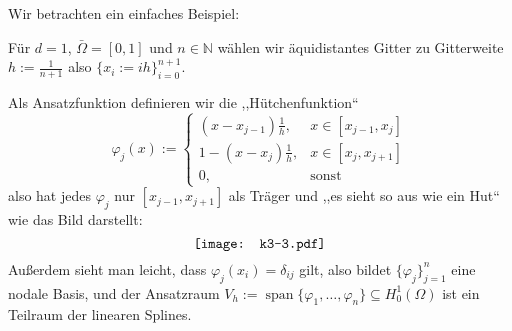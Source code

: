 \documentclass{book}
\newcommand{\assign}{:=}
\newcommand{\tmop}[1]{\ensuremath{\operatorname{#1}}}
\begin{document}
Wir betrachten ein einfaches Beispiel:

F{\"u}r $d = 1$, $\bar{\Omega} = [0, 1]$ und $n \in \mathbb{N}$ w{\"a}hlen
wir {\"a}quidistantes Gitter zu Gitterweite $h \assign \frac{1}{n + 1}$ also
$\{ x_i \assign i h \}_{i = 0}^{n + 1}$.

Als Ansatzfunktion definieren wir die ,,H{\"u}tchenfunktion``
\[ \varphi_j (x) \assign \left\{\begin{array}{cl}
     (x - x_{j - 1}) \frac{1}{h}, & x \in [x_{j - 1}, x_j]\\
     1 - (x - x_j) \frac{1}{h}, & x \in [x_j, x_{j + 1}]\\
     0, & \text{sonst}
   \end{array}\right. \]
also hat jedes $\varphi_j$ nur $[x_{j - 1}, x_{j + 1}]$ als Tr{\"a}ger und
,,es sieht so aus wie ein Hut`` wie das Bild darstellt:
\[ 
   \raisebox{-0.00306159669443232\height}{\texttt{[image: k3-3.pdf]}}
\]
{\hspace{1.7em}}Au{\ss}erdem sieht man leicht, dass $\varphi_j (x_i) =
\delta_{i j}$ gilt, also bildet $\{ \varphi_j \}_{j = 1}^n$ eine nodale Basis,
und der Ansatzraum $V_h \assign \tmop{span} \{ \varphi_1, \ldots, \varphi_n \}
\subseteq H^1_0 (\Omega)$ ist ein Teilraum der linearen Splines.
\end{document}
